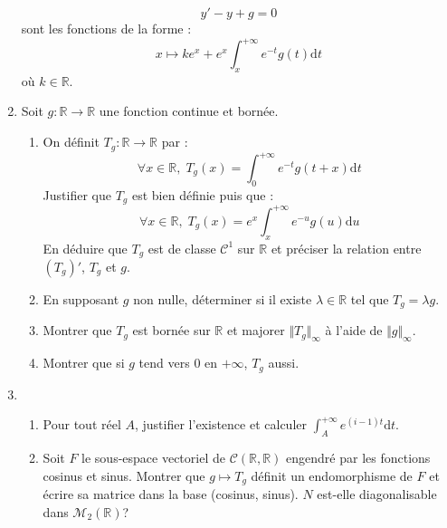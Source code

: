 \documentclass[twoside,french,11pt]{VcCours}
\newcommand{\dt}{\text{d}t}
\begin{document}
\begin{enumerate}
  $$ y'-y+g=0$$
  sont les fonctions de la forme :
  $$ x \mapsto k e^x + e^x \int_x^{+ \infty} e^{-t} g(t) \dt$$
  où $k \in \mathbb{R}$.
  \item Soit $g : \mathbb{R} \rightarrow \mathbb{R}$ une fonction continue et bornée.
  \begin{enumerate}
  \item On définit $T_g : \mathbb{R} \rightarrow \mathbb{R}$ par :
  $$ \forall x \in \mathbb{R}, \; T_g(x) = \int_0^{+ \infty} e^{-t} g(t+x) \dt$$
  Justifier que $T_g$ est bien définie puis que :
  $$ \forall x \in \mathbb{R}, \; T_g(x) = e^x \int_x^{+ \infty} e^{-u} g(u) \textrm{d}u$$
  En déduire que $T_g$ est de classe $\mathcal{C}^1$ sur $\mathbb{R}$ et préciser la relation entre $(T_g)'$, $T_g$ et $g$.
  \item En supposant $g$ non nulle, déterminer si il existe $\lambda \in \mathbb{R}$ tel que $T_g= \lambda g$.
  \item Montrer que $T_g$ est bornée sur $\mathbb{R}$ et majorer $\Vert T_g \Vert_{\infty}$ à l'aide de $\Vert g \Vert_{\infty}$.
  \item Montrer que si $g$ tend vers $0$ en $+ \infty$, $T_g$ aussi.
  \end{enumerate}
  \item 
  \begin{enumerate}
  \item Pour tout réel $A$, justifier l'existence et calculer $ \int_A^{+ \infty} e^{(i-1)t} \dt$.
  \item Soit $F$ le sous-espace vectoriel  de $\mathcal{C}(\mathbb{R}, \mathbb{R})$ engendré par les fonctions cosinus et sinus. Montrer que $g \mapsto T_g$ définit un endomorphisme de $F$ et écrire sa matrice dans la base (cosinus, sinus). $N$ est-elle diagonalisable dans $\mathcal{M}_2(\mathbb{R})$?
  \end{enumerate}
  \end{enumerate}
  
  
  
  
  

  
\end{document}
